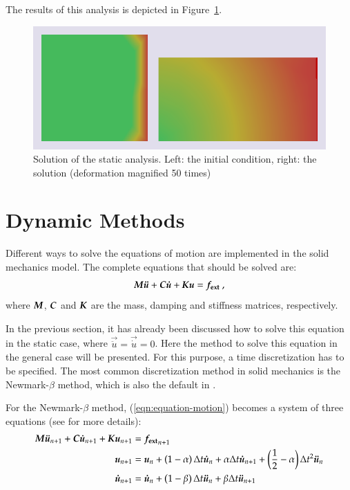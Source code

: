The results of this analysis is depicted in
Figure~\ref{fig:smm:implicit:static_solution}.

\begin{figure}[!htb]
  \centering
  \includegraphics[width=.6\linewidth]{figures/static_analysis}
  \caption{Solution of the static analysis. Left: the initial
condition, right: the solution (deformation magnified 50 times)}
  \label{fig:smm:implicit:static_solution}
\end{figure}

\section{Dynamic Methods} \label{sect:smm:Dynamic_methods}

Different ways to solve the equations of motion are implemented in the
solid mechanics model.  The complete equations that should be solved
are:
\begin{equation}
\label{eqn:equation-motion}
\boldsymbol{M}\boldsymbol{\ddot{u}} +
\boldsymbol{C}\boldsymbol{\dot{u}} + \boldsymbol{K}\boldsymbol{u} = \boldsymbol{f_{{\mathrm{ext}}}}~,
\end{equation}
where $\boldsymbol{M}$, $\boldsymbol{C}$ and $\boldsymbol{K}$ are the mass,
damping and stiffness matrices, respectively.

In the previous section, it has already been discussed how to solve
this equation in the static case, where $\vec{\ddot{u}} =
\vec{\dot{u}} = 0$.  Here the method to solve this equation in the
general case will be presented.  For this purpose, a time
discretization has to be specified.  The most common discretization
method in solid mechanics is the Newmark-$\beta$ method, which is
also the default in \akantu.

For the Newmark-$\beta$ method, (\ref{eqn:equation-motion}) becomes a
system of three equations (see \cite{curnier92a} \cite{hughes-83a} for
more details):
\begin{align}
\boldsymbol{M} \boldsymbol{\ddot{u}}_{n+1} + \boldsymbol{C}\boldsymbol{\dot{u}}_{n+1} + \boldsymbol{K} \boldsymbol{u}_{n+1} &=\boldsymbol{f_{{\mathrm{ext}}}}_{n+1}
\label{eqn:equation-motion-discret} \\
\boldsymbol{u}_{n+1} &=\boldsymbol{u}_{n} + \left(1 - \alpha\right) \Delta t \boldsymbol{\dot{u}}_{n} +
\alpha \Delta t \boldsymbol{\dot{u}}_{n+1} + \left(\frac{1}{2} -
\alpha\right) \Delta t^2
\boldsymbol{\ddot{u}}_{n} \label{eqn:finite-difference-1}\\
\boldsymbol{\dot{u}}_{n+1} &= \boldsymbol{\dot{u}}_{n} + \left(1 - \beta\right)
\Delta t \boldsymbol{\ddot{u}}_{n} + \beta \Delta t
\boldsymbol{\ddot{u}}_{n+1} \label{eqn:finite-difference-2}
\end{align}

